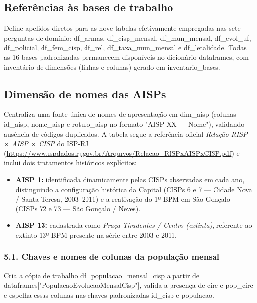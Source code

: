 \documentclass[11pt,a4paper]{article}
\newcommand{\code}[1]{{\ttfamily\footnotesize\allowbreak #1}}
\begin{document}
\subsection{Referências às bases de trabalho}
Define apelidos diretos para as nove tabelas efetivamente empregadas nas sete perguntas de domínio: \code{df\_armas}, \code{df\_cisp\_mensal}, \code{df\_mun\_mensal}, \code{df\_evol\_uf}, \code{df\_policial}, \code{df\_fem\_cisp}, \code{df\_rel}, \code{df\_taxa\_mun\_mensal} e \code{df\_letalidade}. Todas as 16 bases padronizadas permanecem disponíveis no dicionário \code{dataframes}, com inventário de dimensões (\code{linhas} e \code{colunas}) gerado em \code{inventario\_bases}.

\subsection{Dimensão de nomes das AISPs}
Centraliza uma fonte única de nomes de apresentação em \code{dim\_aisp} (colunas \code{id\_aisp}, \code{nome\_aisp} e \code{rotulo\_aisp} no formato \code{"AISP XX --- Nome"}), validando ausência de códigos duplicados. A tabela segue a referência oficial \textit{Relação RISP $\times$ AISP $\times$ CISP} do ISP-RJ (\url{https://www.ispdados.rj.gov.br/Arquivos/Relacao_RISPxAISPxCISP.pdf}) e inclui dois tratamentos históricos explícitos:
\begin{itemize}
  \setlength{\itemsep}{2pt}\setlength{\parskip}{0pt}
  \item \textbf{AISP 1:} identificada dinamicamente pelas CISPs observadas em cada ano, distinguindo a configuração histórica da Capital (CISPs 6 e 7 --- Cidade Nova / Santa Teresa, 2003--2011) e a reativação do 1º BPM em São Gonçalo (CISPs 72 e 73 --- São Gonçalo / Neves).
  \item \textbf{AISP 13:} cadastrada como \textit{Praça Tiradentes / Centro (extinta)}, referente ao extinto 13º BPM presente na série entre 2003 e 2011.
\end{itemize}

\subsubsection*{5.1. Chaves e nomes de colunas da população mensal}
Cria a cópia de trabalho \code{df\_populacao\_mensal\_cisp} a partir de \code{dataframes["PopulacaoEvolucaoMensalCisp"]}, valida a presença de \code{circ} e \code{pop\_circ} e espelha essas colunas nas chaves padronizadas \code{id\_cisp} e \code{populacao}.
\end{document}
